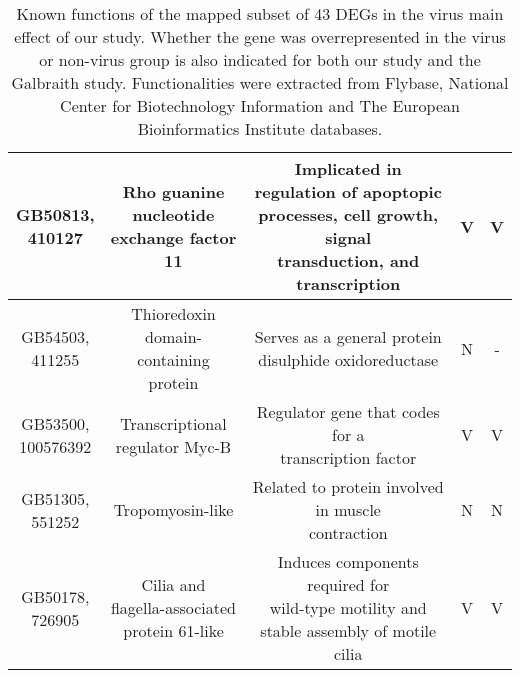 \documentclass{bmcart}
\begin{document}
\begin{linenumbers}
\begin{backmatter}
\begin{table}[h!]
\begin{tabular}{ccccc}
\hline
\makecell{GB50813, \\ 410127} & \makecell{Rho guanine \\ nucleotide \\ exchange factor 11} & \makecell{Implicated in regulation of apoptopic \\ processes, cell growth, signal \\ transduction, and transcription} & V & V \\
\hline
\makecell{GB54503, \\ 411255} & \makecell{Thioredoxin \\ domain-containing \\ protein} & \makecell{Serves as a general protein \\ disulphide oxidoreductase} & N & - \\
\hline
\makecell{GB53500, \\ 100576392} & \makecell{Transcriptional \\ regulator Myc-B} & \makecell{Regulator gene that codes for a \\ transcription factor} & V & V \\
\hline
\makecell{GB51305, \\ 551252} & Tropomyosin-like & \makecell{Related to protein involved in muscle \\ contraction} & N & N \\
\hline
\makecell{GB50178, \\ 726905} & \makecell{Cilia and \\ flagella-associated \\ protein 61-like} & \makecell{Induces components required for \\ wild-type motility and \\ stable assembly of motile cilia} & V & V \\
\hline
\end{tabular}
\caption{Known functions of the mapped subset of 43 DEGs in the virus main effect of our study. Whether the gene was overrepresented in the virus or non-virus group is also indicated for both our study and the Galbraith study. Functionalities were extracted from Flybase, National Center for Biotechnology Information and The European Bioinformatics Institute databases.}
  \label{tbl:virusGenes}
\end{table}


\end{backmatter}
\end{linenumbers}
\end{document}
